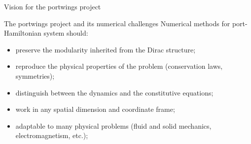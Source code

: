 \documentclass[aspectratio=169]{beamer}
\begin{document}
\begin{frame}{Vision for the portwings project}
	
\end{frame}

\begin{frame}{The portwings project and its numerical challenges}
	Numerical methods for port-Hamiltonian system should:
	\begin{itemize}
		\item preserve the modularity inherited from the Dirac structure;
		\item reproduce the physical properties of the problem (conservation laws, symmetries);
		\item distinguish between the dynamics and the constitutive equations;
		\item work in any spatial dimension and coordinate frame;
		\item adaptable to many physical problems (fluid and solid mechanics, electromagnetism, etc.);
	\end{itemize}
\end{frame}
\end{document}
